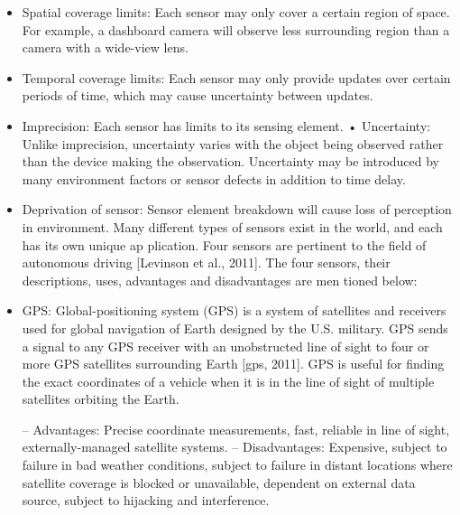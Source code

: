 \begin{itemize}
\item Spatial coverage limits: Each sensor may only cover a certain region of space. For example, a dashboard camera will observe less surrounding region than a
camera with a wide-view lens.
\item Temporal coverage limits: Each sensor may only provide updates over certain periods of time, which may cause uncertainty between updates.
\item  Imprecision: Each sensor has limits to its sensing element. • Uncertainty: Unlike imprecision, uncertainty varies with the object being observed rather than the device making the observation. Uncertainty may be
introduced by many environment factors or sensor defects in addition to time
delay.

\item Deprivation of sensor: Sensor element breakdown will cause loss of perception in environment.
Many diﬀerent types of sensors exist in the world, and each has its own unique ap
plication. Four sensors are pertinent to the ﬁeld of autonomous driving [Levinson et al., 2011].
The four sensors, their descriptions, uses, advantages and disadvantages are men
tioned below:
\item GPS: Global-positioning system (GPS) is a system of satellites and receivers used for global navigation of Earth designed by the U.S. military. GPS sends a
signal to any GPS receiver with an unobstructed line of sight to four or more
GPS satellites surrounding Earth [gps, 2011]. GPS is useful for ﬁnding the
exact coordinates of a vehicle when it is in the line of sight of multiple satellites
orbiting the Earth.

– Advantages: Precise coordinate measurements, fast, reliable in line of
sight, externally-managed satellite systems.
– Disadvantages: Expensive, subject to failure in bad weather conditions,
subject to failure in distant locations where satellite coverage is blocked or
unavailable, dependent on external data source, subject to hijacking and
interference.


\end{itemize}
